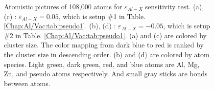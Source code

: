 \begin{figure}[!ht]
\caption[Atomistic pictures of 108,000 atoms for $\varepsilon_{Al-X}$ sensitivity test.]{Atomistic pictures of 108,000 atoms for $\varepsilon_{Al-X}$ sensitivity test. (a), (c) : $\varepsilon_{Al-X} = 0.05$, which is setup \#1 in Table. \ref{Chap:Al/Vac:tab:pseudo1}. (b), (d) : $\varepsilon_{Al-X} = -0.05$, which is setup \#2 in Table. \ref{Chap:Al/Vac:tab:pseudo1}. (a) and (c) are colored by cluster size. The color mapping from dark blue to red is ranked by the cluster size in descending order. (b) and (d) are colored by atom species. Light green, dark green, red, and blue atoms are Al, Mg, Zn, and pseudo atoms respectively. And small gray sticks are bonds between atoms.}
\label{Chap:Al/Vac:fig:sens_Al}
\end{figure}
\endgroup


